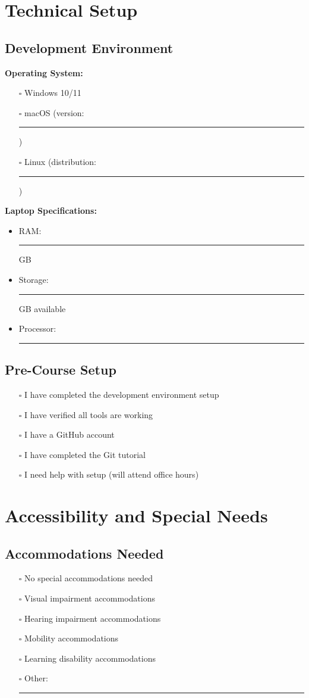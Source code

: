 \documentclass[11pt,a4paper]{article}
\begin{document}
\section{Technical Setup}

\subsection{Development Environment}
\textbf{Operating System:}
\begin{itemize}[leftmargin=0.5cm]
    \item[$\square$] Windows 10/11
    \item[$\square$] macOS (version: \rule{3cm}{0.4pt})
    \item[$\square$] Linux (distribution: \rule{3cm}{0.4pt})
\end{itemize}

\textbf{Laptop Specifications:}
\begin{itemize}
    \item RAM: \rule{2cm}{0.4pt} GB
    \item Storage: \rule{2cm}{0.4pt} GB available
    \item Processor: \rule{4cm}{0.4pt}
\end{itemize}

\subsection{Pre-Course Setup}
\begin{itemize}[leftmargin=0.5cm]
    \item[$\square$] I have completed the development environment setup
    \item[$\square$] I have verified all tools are working
    \item[$\square$] I have a GitHub account
    \item[$\square$] I have completed the Git tutorial
    \item[$\square$] I need help with setup (will attend office hours)
\end{itemize}

\section{Accessibility and Special Needs}

\subsection{Accommodations Needed}
\begin{itemize}[leftmargin=0.5cm]
    \item[$\square$] No special accommodations needed
    \item[$\square$] Visual impairment accommodations
    \item[$\square$] Hearing impairment accommodations
    \item[$\square$] Mobility accommodations
    \item[$\square$] Learning disability accommodations
    \item[$\square$] Other: \rule{5cm}{0.4pt}
\end{itemize}
\end{document}
